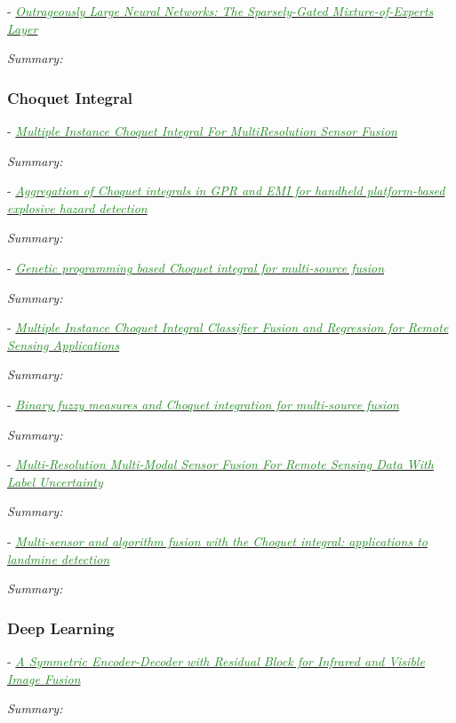 \documentclass[]{article}
\newcommand{\paperentry}[4]{
            \hangindent=1cm
            \cite{#1} - \href{run:../References/#3}{\textcolor{ForestGreen}{\textit{#2}}}
            
            \noindent            
            \begin{minipage}[t]{0.1\linewidth}\hfill\end{minipage}
            \begin{minipage}[t]{0.8\linewidth}\textcolor{NavyBlue}{{\textit{Summary:}}}#4\end{minipage}
            \vspace{.25cm}
          }
\begin{document}
			\paperentry{Shazeer2017SparselyGatedMixtureOfExperts}
			{Outrageously Large Neural Networks: The Sparsely-Gated Mixture-of-Experts Layer}
			{Fusion/HME/Shazeer2017SparselyGatedMixtureOfExperts.pdf}
			{}
		
		
		\subsubsection{Choquet Integral}
		
			\paperentry{Du2017Thesis}
			{Multiple Instance Choquet Integral For MultiResolution Sensor Fusion}
			{Fusion/Du2017Thesis}
			{}
		
			\paperentry{Smith2017ChoquetIntegralLandmine}
			{Aggregation of Choquet integrals in GPR and EMI for handheld platform-based explosive hazard detection}
			{Fusion/Choquet/Smith2017ChoquetIntegralLandmine.pdf}
			{}
			
			\paperentry{Smith2017GeneticProgrammingChoquetIntegral}
			{Genetic programming based Choquet integral for multi-source fusion}
			{Fusion/Choquet/Smith2017GeneticProgrammingChoquetIntegral.pdf}
			{}
		
			\paperentry{Du2019MIChoquetIntegral}
			{Multiple Instance Choquet Integral Classifier Fusion and Regression for Remote Sensing Applications}
			{Fusion/Choquet/Du2019MIChoquetIntegral.pdf}
			{}
		
			\paperentry{Anderson2017BinaryFuzzyMeasureChoquetIntegral}
			{Binary fuzzy measures and Choquet integration for multi-source fusion}
			{Fusion/Choquet/Anderson2017BinaryFuzzyMeasureChoquetIntegral.pdf}
			{}
			
			\paperentry{Du2018MultiResolutionSensorFusion}
			{Multi-Resolution Multi-Modal Sensor Fusion For Remote Sensing Data With Label Uncertainty}
			{Fusion/Choquet/Du2018MultiResolutionSensorFusion.pdf}
			{}
			
			\paperentry{Gader2004ChoquetIntegralLandmine}
			{Multi-sensor and algorithm fusion with the Choquet integral: applications to landmine detection}
			{Fusion/Choquet/Gader2004ChoquetIntegralLandmine.pdf}
			{}
			
			
			
		
		\subsubsection{Deep Learning}
		
			\paperentry{Jian2019AEInfraredVisibleFusion}
			{A Symmetric Encoder-Decoder with Residual Block for Infrared and Visible Image Fusion}
			{Fusion/DeepLearning/Jian2019AEInfraredVisibleFusion.pdf}
			{}
		
\end{document}
